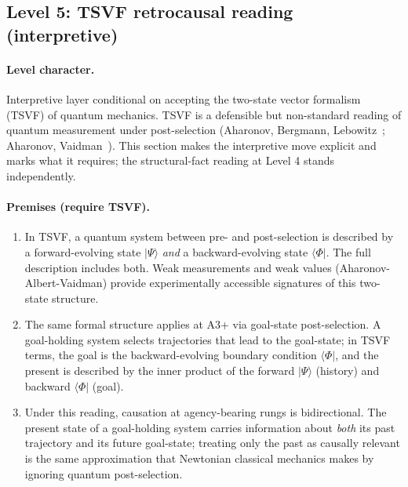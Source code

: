 \documentclass[11pt,a4paper]{article}
\begin{document}
\subsection{Level 5: TSVF retrocausal reading (interpretive)}
\label{sec:conjecture-tsvf}

\paragraph{Level character.} Interpretive layer conditional on accepting the two-state vector formalism (TSVF) of quantum mechanics. TSVF is a defensible but non-standard reading of quantum measurement under post-selection (Aharonov, Bergmann, Lebowitz~\cite{aharonov_bergmann_lebowitz_1964}; Aharonov, Vaidman~\cite{aharonov_vaidman_2007}). This section makes the interpretive move explicit and marks what it requires; the structural-fact reading at Level 4 stands independently.

\paragraph{Premises (require TSVF).}
\begin{enumerate}[leftmargin=*,itemsep=2pt,start=4]
  \item In TSVF, a quantum system between pre- and post-selection is described by a forward-evolving state $|\Psi\rangle$ \emph{and} a backward-evolving state $\langle\Phi|$. The full description includes both. Weak measurements and weak values (Aharonov-Albert-Vaidman) provide experimentally accessible signatures of this two-state structure.
  \item The same formal structure applies at A3+ via goal-state post-selection. A goal-holding system selects trajectories that lead to the goal-state; in TSVF terms, the goal is the backward-evolving boundary condition $\langle\Phi|$, and the present is described by the inner product of the forward $|\Psi\rangle$ (history) and backward $\langle\Phi|$ (goal).
  \item Under this reading, causation at agency-bearing rungs is bidirectional. The present state of a goal-holding system carries information about \emph{both} its past trajectory and its future goal-state; treating only the past as causally relevant is the same approximation that Newtonian classical mechanics makes by ignoring quantum post-selection.
\end{enumerate}
\end{document}
